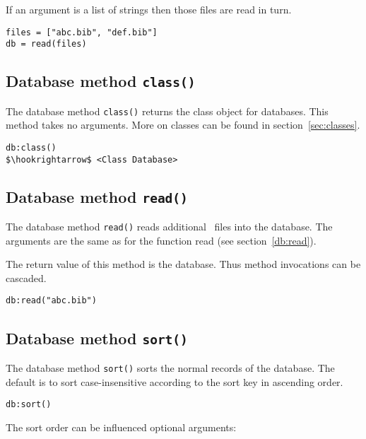 \documentclass[11pt,a4paper]{scrbook}
\makeatletter
\newcommand\rsc[1]{\textsf{#1}\index{#1@\textsf{#1}}}
\makeatother
\begin{document}
If an argument is a list of strings then those files are read in turn.

\begin{lstlisting}[language=BibTool,mathescape=true]
files = ["abc.bib", "def.bib"]
db = read(files)
\end{lstlisting}

\subsection{Database method \texttt{class()}}

The database method \texttt{class()} returns the class object for databases.
This method takes no arguments. More on classes can be found in
section~\ref{sec:classes}.

\begin{lstlisting}[language=BibTool,mathescape=true]
db:class()
$\hookrightarrow$ <Class Database>
\end{lstlisting}

\subsection{Database method \texttt{read()}}

The database method \texttt{read()} reads additional \BibTeX\ files into the
database. The arguments are the same as for the function \rsc{read} (see
section~\ref{db:read}).

The return value of this method is the database. Thus method invocations can
be cascaded.

\begin{lstlisting}[language=BibTool,mathescape=true]
db:read("abc.bib")
\end{lstlisting}

\subsection{Database method \texttt{sort()}}

The database method \texttt{sort()} sorts the normal records of the
database. The default is to sort case-insensitive according to the sort key in
ascending order.

\begin{lstlisting}[language=BibTool,mathescape=true]
db:sort()
\end{lstlisting}

The sort order can be influenced optional arguments:
\end{document}

